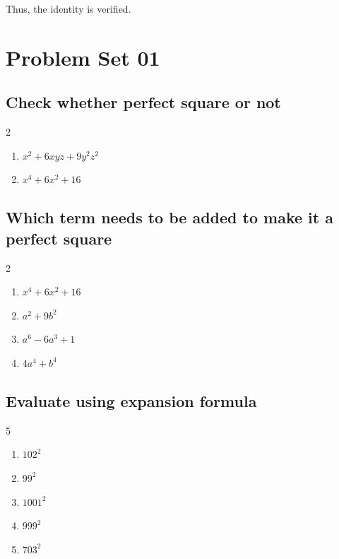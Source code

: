 Thus, the identity is verified.


\newpage
\section{Problem Set 01}
\subsection*{Check whether perfect square or not}
	\begin{multicols}{2}
		\begin{enumerate}
			\item $x^2+6xyz+9y^2z^2$
			\item $x^4+6x^2+16$
		\end{enumerate}
	\end{multicols}
	
	\subsection*{Which term needs to be added to make it a perfect square}
	\begin{multicols}{2}
		\begin{enumerate}
			\item $x^4+6x^2+16$
			\item $a^2+9b^2$
			\item $a^6-6a^3+1$
			\item $4a^4+b^4$
		\end{enumerate}
	\end{multicols}
	\subsection*{Evaluate using expansion formula}
	\begin{multicols}{5}
		\begin{enumerate}
			\item $102^{2} $
			\item $99^{2} $
			\item $1001^2 $
			\item $999^{2} $
			\item $703^{2 }$
		\end{enumerate}
	\end{multicols}
